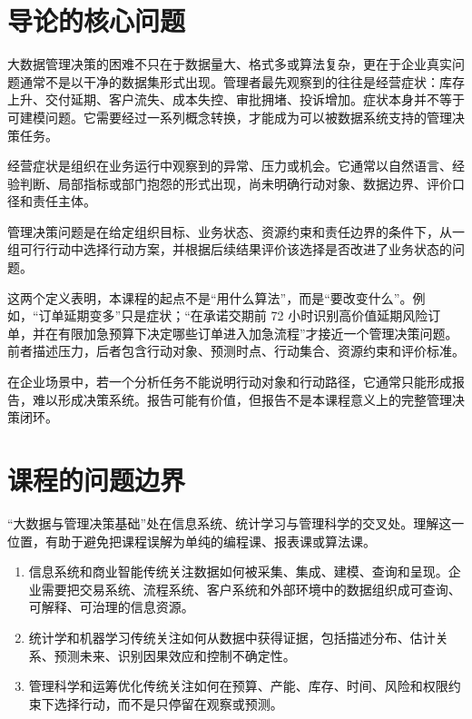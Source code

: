\documentclass[UTF8,fontset=fandol,openany,zihao=-4]{ctexbook}
\begin{document}
\section{导论的核心问题}

大数据管理决策的困难不只在于数据量大、格式多或算法复杂，更在于企业真实问题通常不是以干净的数据集形式出现。管理者最先观察到的往往是经营症状：库存上升、交付延期、客户流失、成本失控、审批拥堵、投诉增加。症状本身并不等于可建模问题。它需要经过一系列概念转换，才能成为可以被数据系统支持的管理决策任务。

\begin{definition}[经营症状]
经营症状是组织在业务运行中观察到的异常、压力或机会。它通常以自然语言、经验判断、局部指标或部门抱怨的形式出现，尚未明确行动对象、数据边界、评价口径和责任主体。
\end{definition}

\begin{definition}[管理决策问题]
管理决策问题是在给定组织目标、业务状态、资源约束和责任边界的条件下，从一组可行行动中选择行动方案，并根据后续结果评价该选择是否改进了业务状态的问题。
\end{definition}

这两个定义表明，本课程的起点不是“用什么算法”，而是“要改变什么”。例如，“订单延期变多”只是症状；“在承诺交期前 72 小时识别高价值延期风险订单，并在有限加急预算下决定哪些订单进入加急流程”才接近一个管理决策问题。前者描述压力，后者包含行动对象、预测时点、行动集合、资源约束和评价标准。

\begin{remark}
在企业场景中，若一个分析任务不能说明行动对象和行动路径，它通常只能形成报告，难以形成决策系统。报告可能有价值，但报告不是本课程意义上的完整管理决策闭环。
\end{remark}

\section{课程的问题边界}

“大数据与管理决策基础”处在信息系统、统计学习与管理科学的交叉处。理解这一位置，有助于避免把课程误解为单纯的编程课、报表课或算法课。

\begin{enumerate}
  \item 信息系统和商业智能传统关注数据如何被采集、集成、建模、查询和呈现。企业需要把交易系统、流程系统、客户系统和外部环境中的数据组织成可查询、可解释、可治理的信息资源。
  \item 统计学和机器学习传统关注如何从数据中获得证据，包括描述分布、估计关系、预测未来、识别因果效应和控制不确定性。
  \item 管理科学和运筹优化传统关注如何在预算、产能、库存、时间、风险和权限约束下选择行动，而不是只停留在观察或预测。
\end{enumerate}
\end{document}
